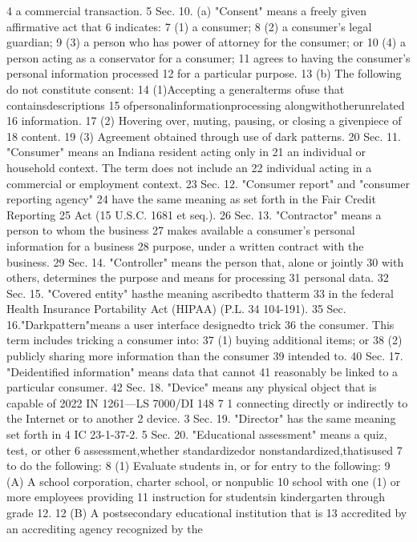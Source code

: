 4 a commercial transaction.
5 Sec. 10. (a) "Consent" means a freely given affirmative act that
6 indicates:
7 (1) a consumer;
8 (2) a consumer's legal guardian;
9 (3) a person who has power of attorney for the consumer; or
10 (4) a person acting as a conservator for a consumer;
11 agrees to having the consumer's personal information processed
12 for a particular purpose.
13 (b) The following do not constitute consent:
14 (1)Accepting a generalterms ofuse that containsdescriptions
15 ofpersonalinformationprocessing alongwithotherunrelated
16 information.
17 (2) Hovering over, muting, pausing, or closing a givenpiece of
18 content.
19 (3) Agreement obtained through use of dark patterns.
20 Sec. 11. "Consumer" means an Indiana resident acting only in
21 an individual or household context. The term does not include an
22 individual acting in a commercial or employment context.
23 Sec. 12. "Consumer report" and "consumer reporting agency"
24 have the same meaning as set forth in the Fair Credit Reporting
25 Act (15 U.S.C. 1681 et seq.).
26 Sec. 13. "Contractor" means a person to whom the business
27 makes available a consumer's personal information for a business
28 purpose, under a written contract with the business.
29 Sec. 14. "Controller" means the person that, alone or jointly
30 with others, determines the purpose and means for processing
31 personal data.
32 Sec. 15. "Covered entity" hasthe meaning ascribedto thatterm
33 in the federal Health Insurance Portability Act (HIPAA) (P.L.
34 104-191).
35 Sec. 16."Darkpattern"means a user interface designedto trick
36 the consumer. This term includes tricking a consumer into:
37 (1) buying additional items; or
38 (2) publicly sharing more information than the consumer
39 intended to.
40 Sec. 17. "Deidentified information" means data that cannot
41 reasonably be linked to a particular consumer.
42 Sec. 18. "Device" means any physical object that is capable of
2022 IN 1261—LS 7000/DI 148
7
1 connecting directly or indirectly to the Internet or to another
2 device.
3 Sec. 19. "Director" has the same meaning set forth in
4 IC 23-1-37-2.
5 Sec. 20. "Educational assessment" means a quiz, test, or other
6 assessment,whether standardizedor nonstandardized,thatisused
7 to do the following:
8 (1) Evaluate students in, or for entry to the following:
9 (A) A school corporation, charter school, or nonpublic
10 school with one (1) or more employees providing
11 instruction for studentsin kindergarten through grade 12.
12 (B) A postsecondary educational institution that is
13 accredited by an accrediting agency recognized by the
